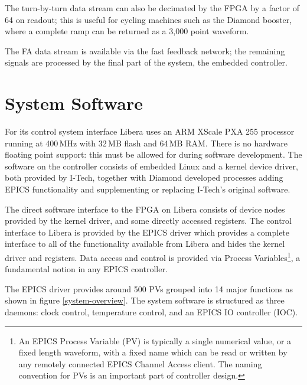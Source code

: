\documentclass{JAC2003}
\begin{document}
The turn-by-turn data stream can also be decimated by the FPGA by a factor of
64 on readout; this is useful for cycling machines such as the Diamond
booster, where a complete ramp can be returned as a 3,000 point waveform.

The FA data stream is available via the fast feedback network; the remaining
signals are processed by the final part of the system, the embedded
controller.


\begin{figure*}[tb]
\centering

\caption{%
    Overview of Libera system with data processing chains and associated
    groups of PVs. The two letter function code is part of the PV name,
    for example \texttt{SR01C-DI-EBPM-01:SA:X} names an SA PV on the first
    storage ring Libera.}
\label{system-overview}
\end{figure*}


\section{System Software}

For its control system interface Libera uses an ARM XScale PXA 255 processor
running at 400\,MHz with 32\,MB flash and 64\,MB RAM.  There is no hardware
floating point support: this must be allowed for during software development.
The software on the controller consists of embedded Linux and a kernel device
driver, both provided by I-Tech, together with Diamond developed processes
adding EPICS functionality and supplementing or replacing I-Tech's original
software\cite{libera-epics-web}.

The direct software interface to the FPGA on Libera consists of device nodes
provided by the kernel driver, and some directly accessed registers.  The
control interface to Libera is provided by the EPICS driver which provides a
complete interface to all of the functionality available from Libera and hides
the kernel driver and registers.  Data access and control is provided via
Process Variables\footnote{%
%
    An EPICS Process Variable (PV) is typically a single numerical value, or a
    fixed length waveform, with a fixed name which can be read or written
    by any remotely connected EPICS Channel Access client.  The naming
    convention for PVs is an important part of controller design.
%
}, a fundamental notion in any EPICS controller.

The EPICS driver provides around 500 PVs grouped into 14 major functions as
shown in figure \ref{system-overview}.  The system software is structured as
three daemons: clock control, temperature control, and an EPICS IO
controller (IOC).
\end{document}
